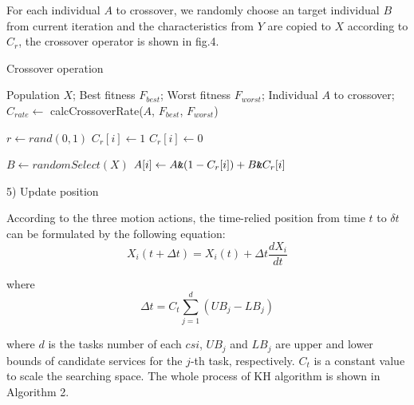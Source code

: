 \documentclass[10pt,journal,compsoc]{IEEEtran}
\begin{document}
For each individual $A$ to crossover, we randomly choose an target individual $B$ from current iteration and the characteristics from $Y$ are copied to $X$ according to $C_r$, the crossover operator is shown in fig.4.

\begin{algorithm}
\caption{Crossover operation}
\label{alg1}
\begin{algorithmic}[1]

\REQUIRE Population $X$; Best fitness $F_{best}$; Worst fitness $F_{worst}$; Individual $A$ to crossover;
\STATE $C_{rate} \leftarrow$ calcCrossoverRate($A$, $F_{best}$, $F_{worst}$)

\STATE $r \leftarrow rand(0,1)$
\STATE $C_r[i] \leftarrow 1$
\ELSE
\STATE $C_r[i] \leftarrow 0$
\ENDIF
\ENDFOR

\STATE $B \leftarrow randomSelect(X)$
\STATE $A[i] \leftarrow A \verb'&'  (1-C_r[i]) + B \verb'&' C_r[i]$ 
\ENDFOR

\end{algorithmic}
\end{algorithm}

5) Update position

According to the three motion actions, the time-relied position from time $t$ to $\delta t$ can be formulated by the following equation:
\begin{equation}
X_i(t+\Delta t) = X_i(t) + \Delta t \frac{dX_i}{dt}
\end{equation}

where
\begin{equation}
\Delta t = C_t\sum_{j=1}^{d}(UB_j - LB_j)
\end{equation}

where $d$ is the tasks number of each $csi$, $UB_j$ and $LB_j$ are upper and lower bounds of candidate services for the $j$-th task, respectively. $C_t$ is a constant value to scale the searching space. The  whole process of KH algorithm is shown in Algorithm 2.
\end{document}
